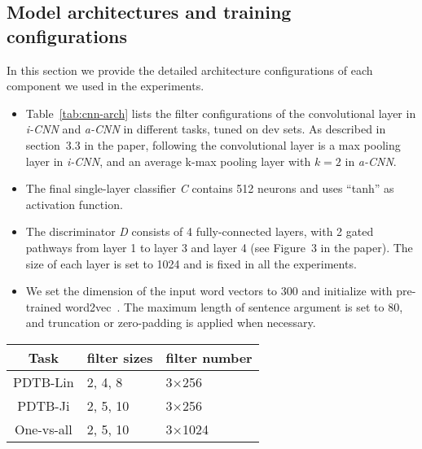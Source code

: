 \documentclass[11pt,a4paper]{article}
\begin{document}
\onecolumn
\begin{appendices}


\section{Model architectures and training configurations}
In this section we provide the detailed architecture configurations of each component we used in the experiments.

\begin{itemize}
\item Table~\ref{tab:cnn-arch} lists the filter configurations of the convolutional layer in {\it i-CNN} and {\it a-CNN} in different tasks, tuned on dev sets. As described in section~3.3 in the paper, following the convolutional layer is a max pooling layer in {\it i-CNN}, and an average k-max pooling layer with $k=2$ in {\it a-CNN}. 
\item The final single-layer classifier {\it C} contains 512 neurons and uses ``tanh'' as activation function. 
\item The discriminator {\it D} consists of 4 fully-connected layers, with 2 gated pathways from layer 1 to layer 3 and layer 4 (see Figure~3 in the paper). The size of each layer is set to 1024 and is fixed in all the experiments.
\item We set the dimension of the input word vectors to 300 and initialize with pre-trained word2vec~\cite{mikolov2013distributed}. The maximum length of sentence argument is set to 80, and truncation or zero-padding is applied when necessary.
\end{itemize}

\begin{table*}[!h]
  \centering
  \begin{tabular}{|c|l|l|}
     \hline
     Task &  filter sizes & filter number   \\ \hline\hline
     {PDTB-Lin} & 2, 4, 8 & 3$\times$256 \\
	 \hline
     {PDTB-Ji} & 2, 5, 10 & 3$\times$256\\
	 \hline
     {One-vs-all} & 2, 5, 10 & 3$\times$1024\\
     \hline
   \end{tabular}
  \caption{The convolutional architectures of {\it i-CNN} and {\it a-CNN} in different tasks (section~4). For example, in PDTB-Lin, we use 3 sets of filters, each of which is of size 2, 4, and 8, respectively; and each set has 256 filters.}
  \label{tab:cnn-arch}
\end{table*}


\end{appendices}
\end{document}
